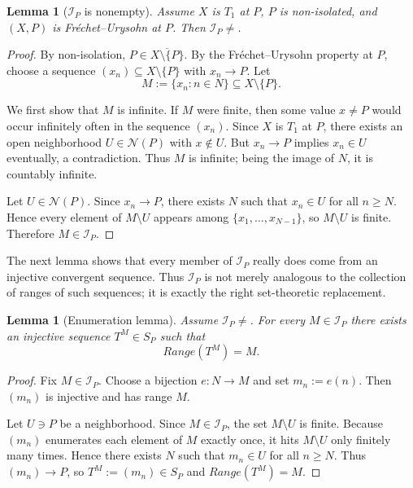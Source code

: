 \documentclass[11pt]{amsart}
\theoremstyle{plain}
\newtheorem{lemma}[theorem]{Lemma}
\theoremstyle{definition}
\theoremstyle{remark}
\newcommand{\Sp}{\mathcal{S}_P}
\newcommand{\N}{\mathbb{N}}
\DeclareMathOperator{\Range}{Range}
\newcommand{\cl}[1]{\overline{#1}}
\def\Sp{S_P}%
\def\N{N}%
\def\Range{Range}%
\def\emptyset{}%
\begin{document}
\begin{lemma}[$\mathcal I_P$ is nonempty]\label{lem:IP_nonempty}
Assume $X$ is $T_1$ at $P$, $P$ is non-isolated, and $(X,P)$ is Fr\'echet--Urysohn at $P$.
Then $\mathcal I_P\neq\emptyset$.
\end{lemma}

\begin{proof}
By non-isolation, $P\in\cl{X\setminus\{P\}}$.
By the Fr\'echet--Urysohn property at $P$, choose a sequence $(x_n)\subseteq X\setminus\{P\}$ with $x_n\to P$.
Let
\[
M:=\{x_n:n\in\N\}\subseteq X\setminus\{P\}.
\]

We first show that $M$ is infinite.
If $M$ were finite, then some value $x\neq P$ would occur infinitely often in the sequence $(x_n)$.
Since $X$ is $T_1$ at $P$, there exists an open neighborhood $U\in\mathcal N(P)$ with $x\notin U$.
But $x_n\to P$ implies $x_n\in U$ eventually, a contradiction.
Thus $M$ is infinite; being the image of $\N$, it is countably infinite.

Let $U\in\mathcal N(P)$.
Since $x_n\to P$, there exists $N$ such that $x_n\in U$ for all $n\ge N$.
Hence every element of $M\setminus U$ appears among $\{x_1,\dots,x_{N-1}\}$, so $M\setminus U$ is finite.
Therefore $M\in\mathcal I_P$.
\end{proof}

The next lemma shows that every member of $\mathcal I_P$ really does come from an injective convergent sequence.
Thus $\mathcal I_P$ is not merely analogous to the collection of ranges of such sequences; it is exactly the right set-theoretic replacement.

\begin{lemma}[Enumeration lemma]\label{lem:enumerate_IP}
Assume $\mathcal I_P\neq\emptyset$.
For every $M\in\mathcal I_P$ there exists an injective sequence $T^M\in\Sp$ such that
\[
\Range(T^M)=M.
\]
\end{lemma}

\begin{proof}
Fix $M\in\mathcal I_P$.
Choose a bijection $e:\N\to M$ and set $m_n:=e(n)$.
Then $(m_n)$ is injective and has range $M$.

Let $U\ni P$ be a neighborhood.
Since $M\in\mathcal I_P$, the set $M\setminus U$ is finite.
Because $(m_n)$ enumerates each element of $M$ exactly once, it hits $M\setminus U$ only finitely many times.
Hence there exists $N$ such that $m_n\in U$ for all $n\ge N$.
Thus $(m_n)\to P$, so $T^M:=(m_n)\in\Sp$ and $\Range(T^M)=M$.
\end{proof}
\end{document}
